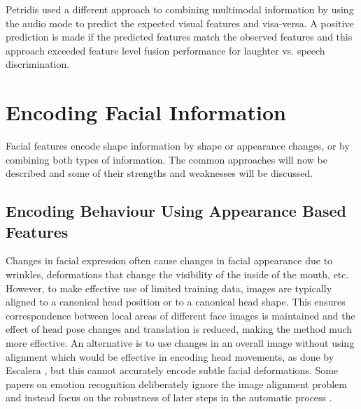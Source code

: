 Petridis \etal \cite{Petridis2010} used a different approach to combining multimodal information by using the audio mode to predict the expected visual features and visa-versa. A positive prediction is made if the predicted features match the observed features and this approach exceeded feature level fusion performance for laughter vs. speech discrimination.



\section{Encoding Facial Information}
\label{BackgroundEncodeFacialInfo}



Facial features encode shape information by shape or appearance changes, or by combining both types of information. The common approaches will now be described and some of their strengths and weaknesses will be discussed.

\subsection{Encoding Behaviour Using Appearance Based Features}

Changes in facial expression often cause changes in facial appearance due to wrinkles, deformations that change the visibility of the inside of the mouth, etc. However, to make effective use of limited training data, images are typically aligned to a canonical head position or to a canonical head shape. This ensures correspondence between local areas of different face images is maintained and the effect of head pose changes and translation is reduced, making the method much more effective. An alternative is to use changes in an overall image without using alignment which would be effective in encoding head movements, as done by Escalera \etal \cite{Escalera2009}, but this cannot accurately encode subtle facial deformations. Some papers on emotion recognition deliberately ignore the image alignment problem and instead focus on the robustness of later steps in the automatic process \cite{Shan2009}. %

